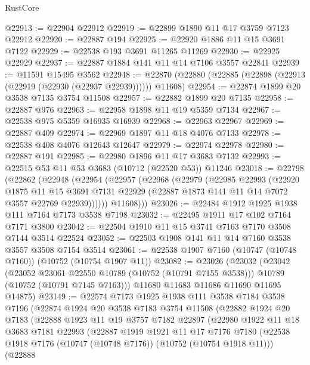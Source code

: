 \begin{lexlean}{RustCore}
\begin{coremodule}
@22913 := @22904 @22912
@22919 := @22899 @1890 @11 @17 @3759 @7123 @22912
@22920 := @22887 @194
@22925 := @22920 @1886 @11 @15 @3691 @7122
@22929 := @22538 @193 @3691 @11265 @11269
@22930 := @22925 @22929
@22937 := @22887 @1884 @141 @11 @14 @7106 @3557 @22841
@22939 := @11591 @15495 @3562
@22948 := @22870 (@22880 (@22885 (@22898 (@22913 (@22919 (@22930 (@22937 @22939)))))) @11608)
@22954 := @22874 @1899 @20 @3538 @7135 @3754 @11508
@22957 := @22882 @1899 @20 @7135
@22958 := @22887 @976
@22963 := @22958 @1898 @11 @19 @5359 @7134
@22967 := @22538 @975 @5359 @16935 @16939
@22968 := @22963 @22967
@22969 := @22887 @409
@22974 := @22969 @1897 @11 @18 @4076 @7133
@22978 := @22538 @408 @4076 @12643 @12647
@22979 := @22974 @22978
@22980 := @22887 @191
@22985 := @22980 @1896 @11 @17 @3683 @7132
@22993 := @22515 @53 @11 @53 @3683 (@10712 (@22520 @53)) @11246
@23018 := @22798
    (@22862
      (@22948
        (@22954
          (@22957
            (@22968
              (@22979
                (@22985
                  @22993
                  (@22920
                    @1875
                    @11
                    @15
                    @3691
                    @7131
                    @22929
                    (@22887 @1873 @141 @11 @14 @7072 @3557 @22769 @22939))))))
          @11608)))
@23026 := @22484 @1912 @1925 @1938 @111 @7164 @7173 @3538 @7198
@23032 := @22495 @1911 @17 @102 @7164 @7171 @3800
@23042 := @22504 @1910 @11 @15 @3741 @7163 @7170 @3508 @7144 @3514 @22524
@23052 := @22503 @1908 @141 @11 @14 @7160 @3538 @3557 @3508 @7154 @3514
@23061 := @22538 @1907 @7160 (@10747 (@10748 @7160)) (@10752 (@10754 @1907 @11))
@23082 := @23026
    (@23032
      (@23042
        (@23052 @23061 @22550 @10789 (@10752 (@10791 @7155 @3538)))
        @10789
        (@10752 (@10791 @7145 @7163)))
      @11680
      @11683
      @11686
      @11690
      @11695
      @14875)
@23149 := @22574
    @7173
    @1925
    @1938
    @111
    @3538
    @7184
    @3538
    @7196
    (@22874
      @1924
      @20
      @3538
      @7183
      @3754
      @11508
      (@22882
        @1924
        @20
        @7183
        (@22888
          @1923
          @11
          @19
          @3757
          @7182
          @22897
          (@22980
            @1922
            @11
            @18
            @3683
            @7181
            @22993
            (@22887
              @1919
              @1921
              @11
              @17
              @7176
              @7180
              (@22538 @1918 @7176 (@10747 (@10748 @7176)) (@10752 (@10754 @1918 @11)))
              (@22888

\end{coremodule}
\end{lexlean}
